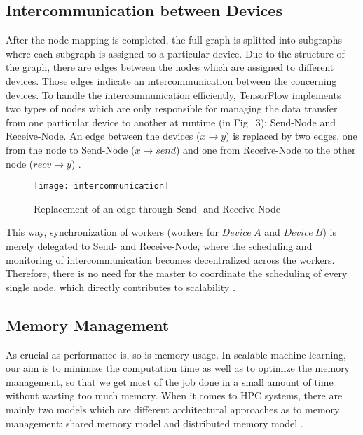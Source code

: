 \documentclass[ieeetran]{article}
\begin{document}
\subsection{Intercommunication between Devices} %
\label{sub:intercommunication_between_devices}
After the node mapping is completed, the full graph is splitted into subgraphs where each subgraph is assigned to a particular device. Due to the structure of the graph, there are edges between the nodes which are assigned to different devices. Those edges indicate an intercommunication between the concerning devices. To handle the intercommunication efficiently, TensorFlow implements two types of nodes which are only responsible for managing the data transfer from one particular device to another at runtime (in Fig.\ 3): Send-Node and Receive-Node. An edge between the devices ($x \rightarrow y$) is replaced by two edges, one from the node to Send-Node ($x \rightarrow send$) and one from Receive-Node to the other node ($recv \rightarrow y$) \cite{first}.
\pagebreak
\begin{figure}[h!]
  \centering
  \texttt{[image: intercommunication]}
  \caption{Replacement of an edge through Send- and Receive-Node}
  \label{fig:intercommunication}
\end{figure}

\hspace{-0.52cm}This way, synchronization of workers (workers for $Device \ A$ and $Device\ B$) is merely delegated to Send- and Receive-Node, where the scheduling and monitoring of intercommunication becomes decentralized across the workers. Therefore, there is no need for the master to coordinate the scheduling of every single node, which directly contributes to scalability \cite{first}.

\subsection{Memory Management} %
\label{sub:memory_management}
As crucial as performance is, so is memory usage. In scalable machine learning, our aim is to minimize the computation time as well as to optimize the memory management, so that we get most of the job done in a small amount of time without wasting too much memory. When it comes to HPC systems, there are mainly two models which are different architectural approaches as to memory management: shared memory model and distributed memory model \cite{second}.
\end{document}

